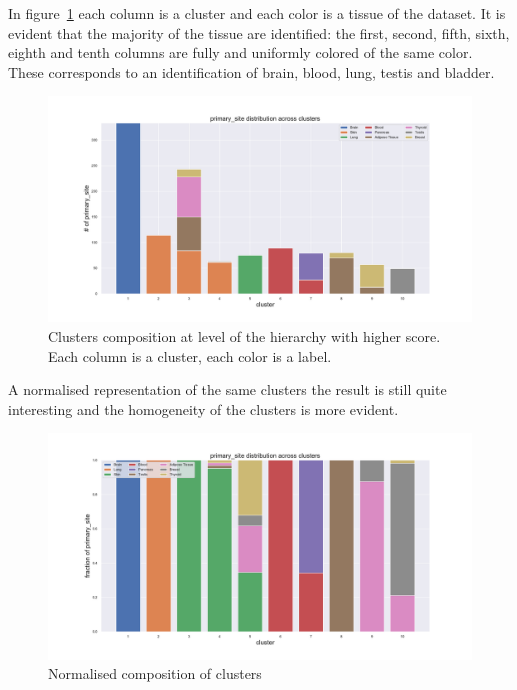 In figure~\ref{fig:topic/gtex/oversigma_10tissue/clustercomposition_l3_primary_site} each column is a cluster and each color is a tissue of the dataset. It is evident that the majority of the tissue are identified: the first, second, fifth, sixth, eighth and tenth columns are fully and uniformly colored of the same color. These corresponds to an identification of brain, blood, lung, testis and bladder.
\begin{figure}[htb!]
    \centering
    \includegraphics[width=0.9\linewidth]{pictures/topic/gtex/oversigma_10tissue/clustercomposition_l3_primary_site.pdf}
    \caption{Clusters composition at level of the hierarchy with higher score. Each column is a cluster, each color is a label.}
    \label{fig:topic/gtex/oversigma_10tissue/clustercomposition_l3_primary_site}
\end{figure}
A normalised representation of the same clusters the result is still quite interesting and the homogeneity of the clusters is more evident.
\begin{figure}[htb!]
    \centering
    \includegraphics[width=0.9\linewidth]{pictures/topic/gtex/oversigma_10tissue/fraction_clustercomposition_l3_primary_site.pdf}
    \caption{Normalised composition of clusters}
    \label{fig:topic/gtex/oversigma_10tissue/fraction_clustercomposition_l3_primary_site}
\end{figure}
